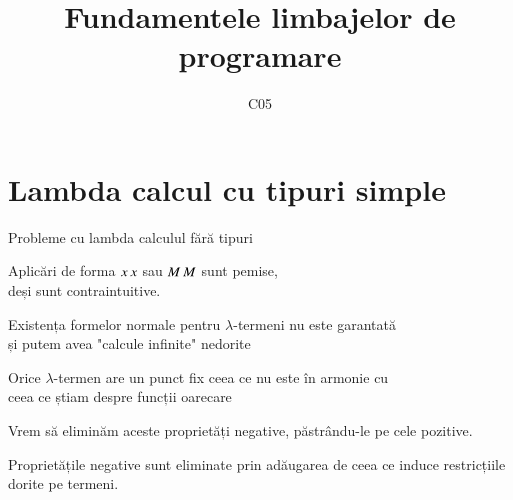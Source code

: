 \documentclass[xcolor=pdftex,romanian,colorlinks]{beamer}
\title[FLP]{Fundamentele limbajelor de programare}
\subtitle{C05}
\date{}
\begin{document}
\begin{frame}
  \titlepage
\end{frame}

\setlength{\leftmargini}{12pt}


\section{\color{section-color} Lambda calcul cu tipuri simple}

\begin{frame}{Probleme cu lambda calculul fără tipuri}


\hspace{.4cm}{\color{False} - } Aplicări de forma $x\, x$ sau $M\, M$ sunt pemise, \\ \hspace{.7cm}deși sunt contraintuitive.

\hspace{.4cm}{\color{False} - } Existența formelor normale pentru $\lambda$-termeni nu este garantată \\ \hspace{.7cm}și putem avea "calcule infinite" nedorite

\hspace{.4cm}{\color{False} - } Orice $\lambda$-termen are un punct fix ceea ce nu este în armonie cu \\ \hspace{.7cm}ceea ce știam despre funcții oarecare

Vrem să eliminăm aceste proprietăți negative, păstrându-le pe cele pozitive.

Proprietățile negative sunt eliminate prin adăugarea de  ceea ce induce restricțiile dorite pe termeni.

\end{frame}
\end{document}
